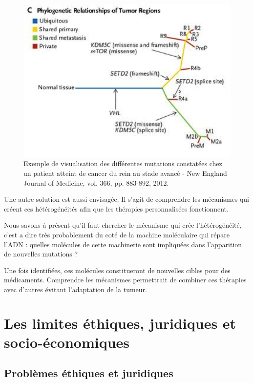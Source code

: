 \documentclass[12pt, openany]{report}
\begin{document}
  \begin{figure}[H]
\begin{center}
    \includegraphics[scale=0.6]{Images/im14.png}
\caption{Exemple de visualisation des différentes mutations constatées chez un patient atteint de cancer du rein au stade avancé - New England Journal of Medicine, vol. 366, pp. 883-892, 2012.}\label{fig:visu}
\end{center}
\end{figure}

Une autre solution est aussi envisagée. Il s’agit de comprendre les mécanismes qui créent ces hétérogénéités afin que les thérapies personnalisées fonctionnent. 

Nous savons à présent qu'il faut chercher le mécanisme qui crée l'hétérogénéité, c'est a dire très probablement du coté de la machine moléculaire qui répare l'ADN : quelles molécules de cette machinerie sont impliquées dans l'apparition de nouvelles mutations ? 

Une fois identifiées, ces molécules constitueront de nouvelles cibles pour des médicaments.
 Comprendre les mécanismes permettrait de combiner ces thérapies avec d'autres évitant l'adaptation de la tumeur.

\section{Les limites éthiques, juridiques et socio-économiques}
 
\subsection{Problèmes éthiques et juridiques}
\end{document}
